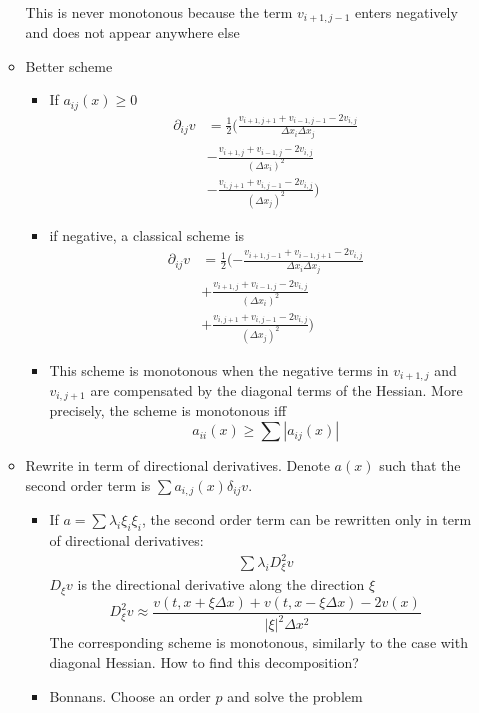 \documentclass[english]{article}
\begin{document}
\begin{itemize}
\begin{itemize}
\begin{align*}
		\end{align*}
		This is never monotonous because the term $v_{i+1, j-1}$ enters negatively and does not appear anywhere else
		\item Better scheme
		\begin{itemize}
			\item If $a_{ij}(x) \geq 0$
			\begin{align*}
				\partial_{ij}v&= \frac{1}{2}(\frac{v_{i+1, j+1} + v_{i-1, j-1}- 2v_{i,j}}{\Delta x_i \Delta x_j} \\
				&-  \frac{v_{i+1, j} + v_{i-1, j}- 2v_{i,j}}{(\Delta x_i)^2}\\
				&-  \frac{v_{i, j+1} + v_{i, j-1}- 2v_{i,j}}{(\Delta x_j)^2})
			\end{align*}
			\item if negative, a classical scheme is
			\begin{align*}
				\partial_{ij}v&= \frac{1}{2}(-\frac{v_{i+1, j-1} + v_{i-1, j+1}- 2v_{i,j}}{\Delta x_i \Delta x_j} \\
				&+  \frac{v_{i+1, j} + v_{i-1, j}- 2v_{i,j}}{(\Delta x_i)^2}\\
				&+  \frac{v_{i, j+1} + v_{i, j-1}- 2v_{i,j}}{(\Delta x_j)^2})
			\end{align*}
			\item This scheme is monotonous when the negative terms in $v_{i+1, j}$ and $v_{i, j+1}$ are compensated by the diagonal terms of the Hessian. More precisely, the scheme is monotonous iff 		$$a_{ii}(x) \geq \sum |a_{ij}(x)|$$
		\end{itemize}
		\item Rewrite in term of directional derivatives. Denote $a(x)$ such that the second order term is $\sum a_{i, j}(x) \delta_{ij} v$.
		\begin{itemize}
			\item If  $a = \sum \lambda_i \xi_i \xi_i$, the second order term can be rewritten only in term of directional derivatives:
			\begin{align*}
				\sum \lambda_i D_\xi^2v
			\end{align*}
			$D_\xi v$ is the directional derivative along the direction $\xi$
			$$D^2_\xi v \approx \frac{v(t, x+\xi \Delta x) + v(t, x-\xi \Delta x) - 2 v(x)}{|\xi|^2 \Delta x^2}$$
			The corresponding scheme is monotonous, similarly to the case with diagonal Hessian. 
			How to find this decomposition?
			\item 
			Bonnans. Choose an order $p$ and solve the problem 
			\begin{align*}

\end{align*}
\end{itemize}
\end{itemize}
\end{itemize}
\end{document}

